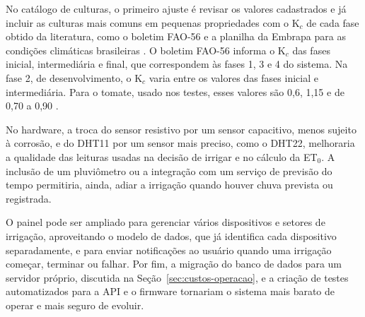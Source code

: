 No catálogo de culturas, o primeiro ajuste é revisar os valores cadastrados e já incluir as culturas mais comuns em pequenas propriedades com o K$_c$ de cada fase obtido da literatura, como o boletim FAO-56 \cite{allen1998} e a planilha da Embrapa para as condições climáticas brasileiras \cite{albuquerque2021planilha}. O boletim FAO-56 informa o K$_c$ das fases inicial, intermediária e final, que correspondem às fases 1, 3 e 4 do sistema. Na fase 2, de desenvolvimento, o K$_c$ varia entre os valores das fases inicial e intermediária. Para o tomate, usado nos testes, esses valores são 0,6, 1,15 e de 0,70 a 0,90 \cite{allen1998}.

No hardware, a troca do sensor resistivo por um sensor capacitivo, menos sujeito à corrosão, e do DHT11 por um sensor mais preciso, como o DHT22, melhoraria a qualidade das leituras usadas na decisão de irrigar e no cálculo da ET$_0$. A inclusão de um pluviômetro ou a integração com um serviço de previsão do tempo permitiria, ainda, adiar a irrigação quando houver chuva prevista ou registrada.

O painel pode ser ampliado para gerenciar vários dispositivos e setores de irrigação, aproveitando o modelo de dados, que já identifica cada dispositivo separadamente, e para enviar notificações ao usuário quando uma irrigação começar, terminar ou falhar. Por fim, a migração do banco de dados para um servidor próprio, discutida na Seção~\ref{sec:custos-operacao}, e a criação de testes automatizados para a API e o firmware tornariam o sistema mais barato de operar e mais seguro de evoluir.